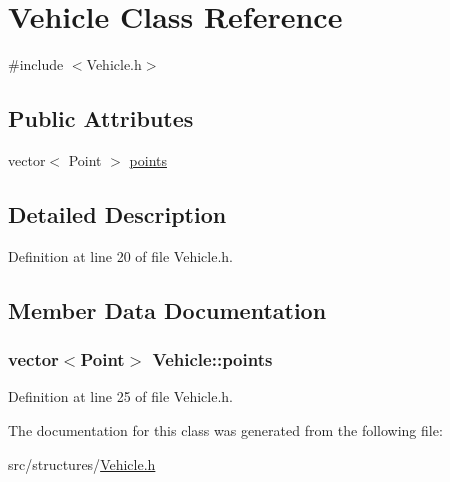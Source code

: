 \hypertarget{class_vehicle}{
\section{\-Vehicle \-Class \-Reference}
\label{class_vehicle}
}


{\ttfamily \#include $<$\-Vehicle.\-h$>$}

\subsection*{\-Public \-Attributes}
\begin{DoxyCompactItemize}
\item 
vector$<$ \-Point $>$ \hyperlink{class_vehicle_a2af9db56dd7456796efa2524243f8d94}{points}
\end{DoxyCompactItemize}


\subsection{\-Detailed \-Description}


\-Definition at line 20 of file \-Vehicle.\-h.



\subsection{\-Member \-Data \-Documentation}
\hypertarget{class_vehicle_a2af9db56dd7456796efa2524243f8d94}{
\subsubsection[{points}]{\setlength{\rightskip}{0pt plus 5cm}vector$<$\-Point$>$ {\bf \-Vehicle\-::points}}}
\label{class_vehicle_a2af9db56dd7456796efa2524243f8d94}


\-Definition at line 25 of file \-Vehicle.\-h.



\-The documentation for this class was generated from the following file\-:\begin{DoxyCompactItemize}
\item 
src/structures/\hyperlink{_vehicle_8h}{\-Vehicle.\-h}\end{DoxyCompactItemize}
